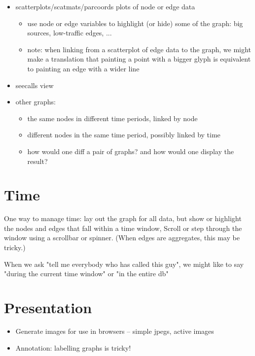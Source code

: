 \documentclass[11pt]{article}
\begin{document}
\begin{itemize} \itemsep 0em

\item scatterplots/scatmats/parcoords plots of node or edge data
  \begin{itemize} \itemsep 0em
  \item use node or edge variables to highlight (or hide) some of
        the graph: big sources, low-traffic edges, ...
  \item note: when linking from a scatterplot of edge data to the
        graph, we might make a translation that painting a point
        with a bigger glyph is equivalent to painting an edge with
        a wider line
  \end{itemize}

\item seecalls view

\item other graphs:
  \begin{itemize} \itemsep 0em
  \item the same nodes in different time periods, linked by node
  \item different nodes in the same time period, possibly linked by time
  \item how would one diff a pair of graphs?  and how would one
        display the result?
  \end{itemize}

\end{itemize}


\section {Time}

 One way to manage time:  lay out the graph for all data, but
   show or highlight the nodes and edges that fall within a time window,
   Scroll or step through the window using a scrollbar or spinner.
   (When edges are aggregates, this may be tricky.)
 
 When we ask "tell me everybody who has called this guy", we might
  like to say "during the current time window" or "in the entire db"

\section {Presentation}

\begin{itemize} \itemsep 0em
\item Generate images for use in browsers -- simple jpegs,
  active images
\item Annotation: labelling graphs is tricky!
\end {itemize}
\end{document}
